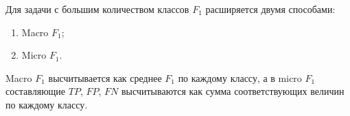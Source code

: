 Для задачи с большим количеством классов $F_1$ расширяется двумя способами:
\begin{enumerate}
    \item Macro $F_1$;
    \item Micro $F_1$.
\end{enumerate}

Macro $F_1$ высчитывается как среднее $F_1$ по каждому классу, а в micro $F_1$ составляющие $TP$, $FP$, $FN$ высчитываются как сумма 
соответствующих величин по каждому классу.  
